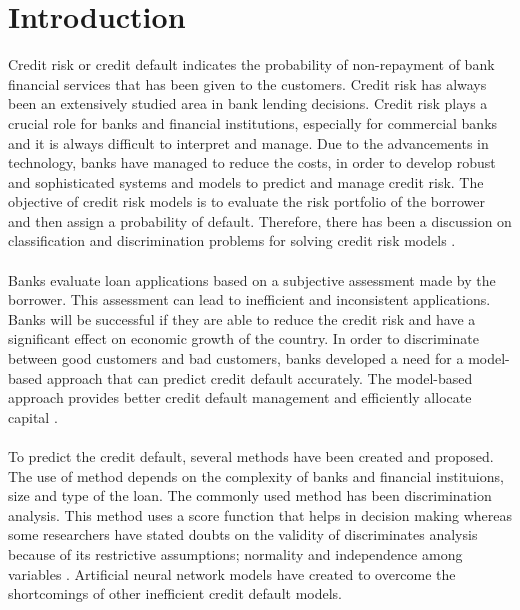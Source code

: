 \documentclass{article}[]
\begin{document}
\section{Introduction}
\label{intro}
Credit risk or credit default indicates the probability of non-repayment of bank financial services that has been given to the customers. Credit risk has always been an extensively studied area in bank lending decisions. Credit risk plays a crucial role for banks and financial institutions, especially for commercial banks and it is always difficult to interpret and manage. Due to the advancements in technology, banks have managed to reduce the costs, in order to develop robust and sophisticated systems and models to predict and manage credit risk.
The objective of credit risk models is to evaluate the risk portfolio of the borrower and then assign a probability of default. Therefore, there has been a discussion on classification and discrimination problems for solving credit risk models \cite{pacelli2011artificial}. \\\\
Banks evaluate loan applications based on a subjective assessment made by the borrower. This assessment can lead to inefficient and inconsistent applications. Banks will be successful if they are able to reduce the credit risk and have a significant effect on economic growth of the country. In order to discriminate between good customers and bad customers, banks developed a need for a model-based approach that can predict credit default accurately. The model-based approach provides better credit default management and efficiently allocate capital \cite{angelini2008neural}. \\\\
To predict the credit default, several methods have been created and proposed. The use of method depends on the complexity of banks and financial instituions, size and type of the loan. The commonly used method has been discrimination analysis. This method uses a score function that helps in decision making whereas some researchers have stated doubts on the validity of discriminates analysis because of its restrictive assumptions; normality and independence among variables \cite{eisenbeis1977pitfalls}. Artificial neural network models have created to overcome the shortcomings of other inefficient credit default models.\\\\
\end{document}
